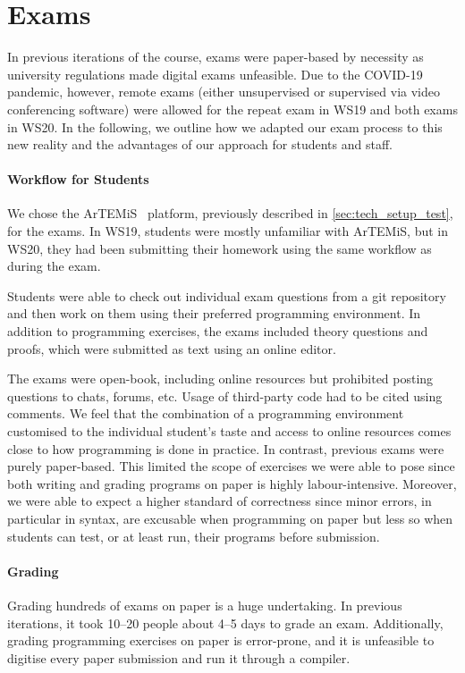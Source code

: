 \section{Exams}\label{sec:exam}
In previous iterations of the course, exams were paper-based by necessity as university regulations made digital exams unfeasible.
Due to the COVID-19 pandemic, however, remote exams (either unsupervised or supervised via video conferencing software) were allowed for the repeat exam in WS19 and both exams in WS20.
In the following, we outline how we adapted our exam process to this new reality and the advantages of our approach for students and staff.

\paragraph{Workflow for Students}

We chose the ArTEMiS~\cite{artemis} platform, previously described in \cref{sec:tech_setup_test}, for the exams.
In WS19, students were mostly unfamiliar with ArTEMiS,
but in WS20, they had been submitting their homework using the same workflow as during the exam.

Students were able to check out individual exam questions from a git repository and then work on them using their preferred programming environment.
In addition to programming exercises, the exams included theory questions and proofs, which were submitted as text using an online editor.

The exams were open-book, including online resources
but prohibited posting questions to chats, forums, etc.
Usage of third-party code had to be cited using comments.
We feel that the combination of a programming environment customised to the individual student's taste and access to online resources comes close to how programming is done in practice.
In contrast, previous exams were purely paper-based.
This limited the scope of exercises we were able to pose
since both writing and grading programs on paper is highly labour-intensive.
Moreover, we were able to expect a higher standard of correctness
since minor errors, in particular in syntax, are excusable when programming on paper but less so when students can test, or at least run, their programs before submission.

\paragraph{Grading}
Grading hundreds of exams on paper is a huge undertaking.
In previous iterations,
it took 10--20 people about 4--5 days to grade an exam.
Additionally, grading programming exercises on paper is error-prone, and it is unfeasible to digitise every paper submission and run it through a compiler.


